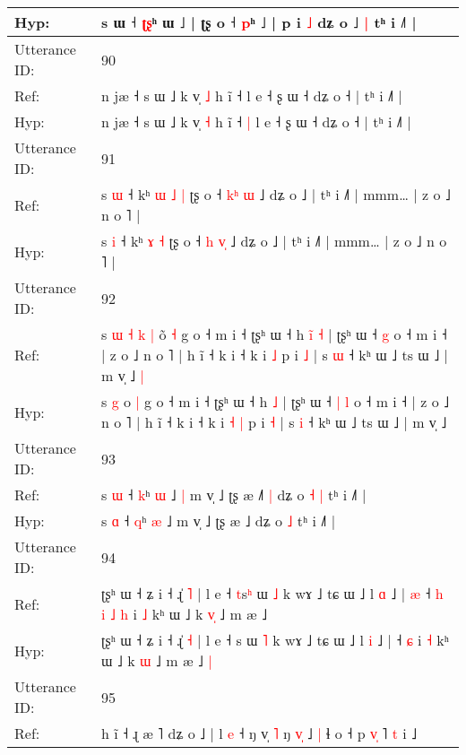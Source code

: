 \documentclass[10pt]{article}
\DeclareRobustCommand{\hl}[1]{{\textcolor{red}{#1}}}
\begin{document}
\begin{longtable}{ll}
 \\
Hyp: & s ɯ ˧ \hl{ʈ}\hl{ʂ}ʰ ɯ ˩ | ʈʂ o ˧ \hl{p}ʰ\hl{}\hl{} ˩ | p i \hl{˩} dʑ o ˩\hl{ }\hl{|} tʰ i ˩˥ |
 \\
\midrule
Utterance ID: & 90 \\
Ref: & n jæ ˧ s ɯ ˩ k v̩ \hl{˩} h ĩ ˧\hl{}\hl{} l e ˧ ʂ ɯ ˧ dʑ o ˧ | tʰ i ˩˥ |
 \\
Hyp: & n jæ ˧ s ɯ ˩ k v̩ \hl{˧} h ĩ ˧\hl{ }\hl{|} l e ˧ ʂ ɯ ˧ dʑ o ˧ | tʰ i ˩˥ |
 \\
\midrule
Utterance ID: & 91 \\
Ref: & s \hl{ɯ} ˧ kʰ\hl{ }\hl{ɯ} \hl{˩} \hl{|} ʈʂ o ˧ \hl{k}\hl{ʰ}\hl{ }\hl{ɯ} ˩ dʑ o ˩ | tʰ i ˩˥ | mmm… | z o ˩ n o ˥ |
 \\
Hyp: & s \hl{i} ˧ kʰ\hl{}\hl{} \hl{ɤ} \hl{˧} ʈʂ o ˧ \hl{h}\hl{ }\hl{v}\hl{̩} ˩ dʑ o ˩ | tʰ i ˩˥ | mmm… | z o ˩ n o ˥ |
 \\
\midrule
Utterance ID: & 92 \\
Ref: & s\hl{ }\hl{ɯ}\hl{ }\hl{˧}\hl{ }\hl{k} \hl{|} o\hl{̃} \hl{˧} g o ˧ m i ˧ ʈʂʰ ɯ ˧ h\hl{ }\hl{i}\hl{̃} \hl{˧} | ʈʂʰ ɯ ˧\hl{}\hl{} \hl{g} o ˧ m i ˧ | z o ˩ n o ˥ | h ĩ ˧ k i ˧ k i\hl{}\hl{} \hl{˩} p i \hl{˩} | s \hl{ɯ} ˧ kʰ ɯ ˩ ts ɯ ˩ | m v̩ ˩\hl{ }\hl{|}
 \\
Hyp: & s\hl{}\hl{}\hl{}\hl{}\hl{}\hl{} \hl{g} o\hl{} \hl{|} g o ˧ m i ˧ ʈʂʰ ɯ ˧ h\hl{}\hl{}\hl{} \hl{˩} | ʈʂʰ ɯ ˧\hl{ }\hl{|} \hl{l} o ˧ m i ˧ | z o ˩ n o ˥ | h ĩ ˧ k i ˧ k i\hl{ }\hl{˧} \hl{|} p i \hl{˧} | s \hl{i} ˧ kʰ ɯ ˩ ts ɯ ˩ | m v̩ ˩\hl{}\hl{}
 \\
\midrule
Utterance ID: & 93 \\
Ref: & s \hl{ɯ} ˧ \hl{k}ʰ \hl{ɯ} ˩\hl{ }\hl{|} m v̩ ˩ ʈʂ æ ˩\hl{˥}\hl{ }\hl{|} dʑ o\hl{ }\hl{˧} \hl{|} tʰ i ˩˥ |
 \\
Hyp: & s \hl{ɑ} ˧ \hl{q}ʰ \hl{æ} ˩\hl{}\hl{} m v̩ ˩ ʈʂ æ ˩\hl{}\hl{}\hl{} dʑ o\hl{}\hl{} \hl{˩} tʰ i ˩˥ |
 \\
\midrule
Utterance ID: & 94 \\
Ref: & ʈʂʰ ɯ ˧ ʑ i ˧ ɻ̍ \hl{˥} | l e ˧ \hl{t}s\hl{ʰ} ɯ \hl{˩} k wɤ ˩ tɕ ɯ ˩ l \hl{ɑ} ˩ |\hl{ }\hl{æ} ˧\hl{ }\hl{h}\hl{ }\hl{i}\hl{ }\hl{˩} \hl{h} i \hl{˩} kʰ ɯ ˩ k \hl{v}\hl{̩} ˩ m æ ˩\hl{}\hl{}
 \\
Hyp: & ʈʂʰ ɯ ˧ ʑ i ˧ ɻ̍ \hl{˧} | l e ˧ \hl{}s\hl{} ɯ \hl{˥} k wɤ ˩ tɕ ɯ ˩ l \hl{i} ˩ |\hl{}\hl{} ˧\hl{}\hl{}\hl{}\hl{}\hl{}\hl{} \hl{ɕ} i \hl{˧} kʰ ɯ ˩ k \hl{}\hl{ɯ} ˩ m æ ˩\hl{ }\hl{|}
 \\
\midrule
Utterance ID: & 95 \\
Ref: & h ĩ ˧ ɻ æ ˥\hl{}\hl{} dʑ o ˩ | l\hl{ }\hl{e} ˧ ŋ v̩ \hl{˥} ŋ \hl{v}\hl{̩} ˩\hl{ }\hl{|} ɬ o ˧ p \hl{v}\hl{̩} ˥ \hl{t} i ˩\hl{}\hl{}

\end{longtable}
\end{document}
